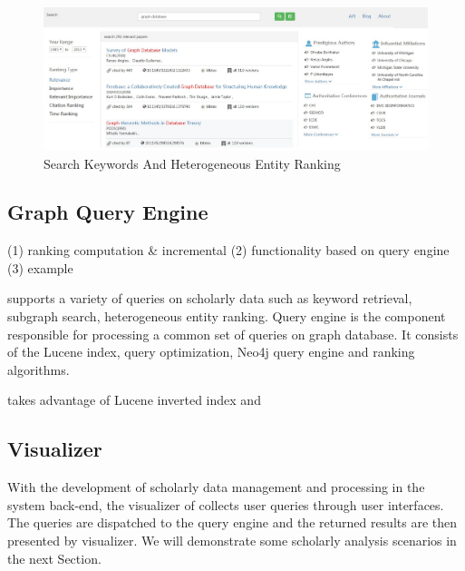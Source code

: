 


\begin{figure}[tp]
\centering
\includegraphics[width=\textwidth]{searchKeywords.pdf}
\caption{Search Keywords And Heterogeneous Entity Ranking}
\label{fig: search keywords}
\vspace{-3ex}
\end{figure}

\subsection{Graph Query Engine} \label{subsec:qe}

(1) ranking computation \& incremental
(2) functionality based on query engine
(3) example

\oursystem supports a variety of queries on scholarly data such as keyword retrieval, subgraph search, heterogeneous entity ranking. Query engine is the component responsible for processing a common set of queries on graph database. It consists of the Lucene index, query optimization, Neo4j query engine and ranking algorithms.

\oursystem takes advantage of Lucene inverted index and 


\subsection{Visualizer}
With the development of scholarly data management and processing in the system back-end, the visualizer of \oursystem collects user queries through user interfaces. The queries are dispatched to the query engine and the returned results are then presented by visualizer.
We will demonstrate some scholarly analysis scenarios in the next Section.

